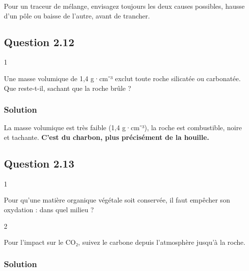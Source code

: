\documentclass[11pt,a4paper]{article}
\begin{document}
\begin{methode}

Pour un traceur de mélange, envisagez toujours les deux causes possibles, hausse d'un pôle ou baisse de l'autre, avant de trancher.

\end{methode}

\hypertarget{question-2.12}{%
\subsection{Question 2.12}\label{question-2.12}}

\begin{indication}{1}

Une masse volumique de 1,4 g·cm⁻³ exclut toute roche silicatée ou carbonatée. Que reste-t-il, sachant que la roche brûle ?

\end{indication}

\hypertarget{solution-22}{%
\subsubsection{Solution}\label{solution-22}}

La masse volumique est très faible (1,4 g·cm⁻³), la roche est combustible, noire et tachante. \textbf{C'est du charbon, plus précisément de la houille.}

\hypertarget{question-2.13}{%
\subsection{Question 2.13}\label{question-2.13}}

\begin{indication}{1}

Pour qu'une matière organique végétale soit conservée, il faut empêcher son oxydation : dans quel milieu ?

\end{indication}

\begin{indication}{2}

Pour l'impact sur le CO₂, suivez le carbone depuis l'atmosphère jusqu'à la roche.

\end{indication}

\hypertarget{solution-23}{%
\subsubsection{Solution}\label{solution-23}}
\end{document}
